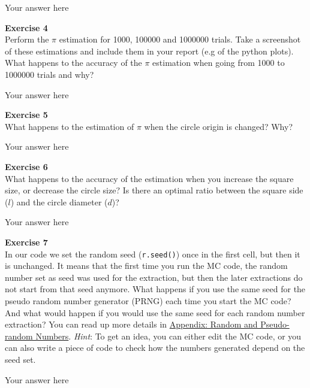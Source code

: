 \documentclass{article}
\begin{document}
Your answer here

\begin{mdframed}
\textbf{Exercise 4}\\
Perform the $\pi$ estimation for 1000, 100000 and 1000000 trials. Take a screenshot of these estimations and include them in your report (e.g of the python plots). What happens to the accuracy of the $\pi$ estimation when going from 1000 to 1000000 trials and why?
\end{mdframed}

Your answer here

\begin{mdframed}
\textbf{Exercise 5}\\
What happens to the estimation of $\pi$ when the circle origin is changed? Why?
\end{mdframed}

Your answer here

\begin{mdframed}
\textbf{Exercise 6}\\
What happens to the accuracy of the estimation when you increase the square size, or decrease the circle size? Is there an optimal ratio between the square side ($l$) and the circle diameter ($d$)?
\end{mdframed}

Your answer here

\begin{mdframed}
\textbf{Exercise 7}\\
In our code we set the random seed (\texttt{r.seed()}) once in the first cell, but then it is unchanged. It means that the first time you run the MC code, the random number set as seed was used for the extraction, but then the later extractions do not start from that seed anymore. What happens if you use the same seed for the pseudo random number generator (PRNG) each time you start the MC code? And what would happen if you would use the same seed for each random number extraction? You can read up more details in \href{https://lcbc-epfl.github.io/mdmc-public/Ex1/prng.html}{Appendix: Random and Pseudo-random Numbers}.
\textit{Hint}: To get an idea, you can either edit the MC code, or you can also write a piece of code to check how the numbers generated depend on the seed set.
\end{mdframed}

Your answer here

\end{document}
